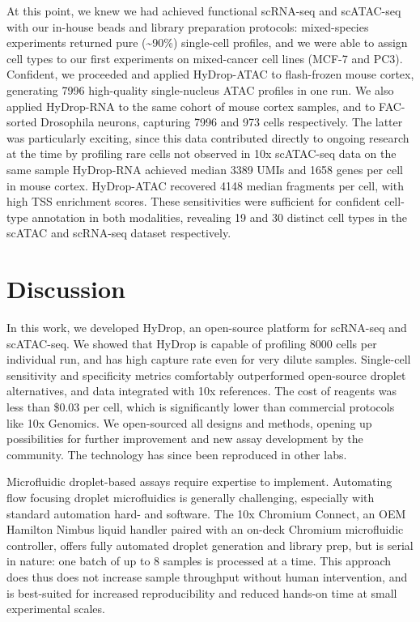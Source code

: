 At this point, we knew we had achieved functional scRNA-seq and scATAC-seq with our in-house beads and library preparation protocols: mixed-species experiments returned pure (\textasciitilde{90}\%) single-cell profiles, and we were able to assign cell types to our first experiments on mixed-cancer cell lines (MCF-7 and PC3). Confident, we proceeded and applied HyDrop-ATAC to flash-frozen mouse cortex, generating \num{7996} high-quality single-nucleus ATAC profiles in one run. We also applied HyDrop-RNA to the same cohort of mouse cortex samples, and to FAC-sorted Drosophila neurons, capturing \num{7996} and \num{973} cells respectively. The latter was particularly exciting, since this data contributed directly to ongoing research at the time by profiling rare cells not observed in 10x scATAC-seq data on the same sample HyDrop-RNA achieved median \num{3389} UMIs and \num{1658} genes per cell in mouse cortex. HyDrop-ATAC recovered \num{4148} median fragments per cell, with high TSS enrichment scores. These sensitivities were sufficient for confident cell-type annotation in both modalities, revealing 19 and 30 distinct cell types in the scATAC and scRNA-seq dataset respectively.

\section{Discussion}
In this work, we developed HyDrop, an open-source platform for scRNA-seq and scATAC-seq. We showed that HyDrop is capable of profiling 8000 cells per individual run, and has high capture rate even for very dilute samples. Single-cell sensitivity and specificity metrics comfortably outperformed open-source droplet alternatives, and data integrated with 10x references. The cost of reagents was less than \$0.03 per cell, which is significantly lower than commercial protocols like 10x Genomics. We open-sourced all designs and methods, opening up possibilities for further improvement and new assay development by the community. The technology has since been reproduced in other labs.

Microfluidic droplet-based assays require expertise to implement. Automating flow focusing droplet microfluidics is generally challenging, especially with standard automation hard- and software. The 10x Chromium Connect, an OEM Hamilton Nimbus liquid handler paired with an on-deck Chromium microfluidic controller, offers fully automated droplet generation and library prep, but is serial in nature: one batch of up to 8 samples is processed at a time. This approach does thus does not increase sample throughput without human intervention, and is best-suited for increased reproducibility and reduced hands-on time at small experimental scales.

